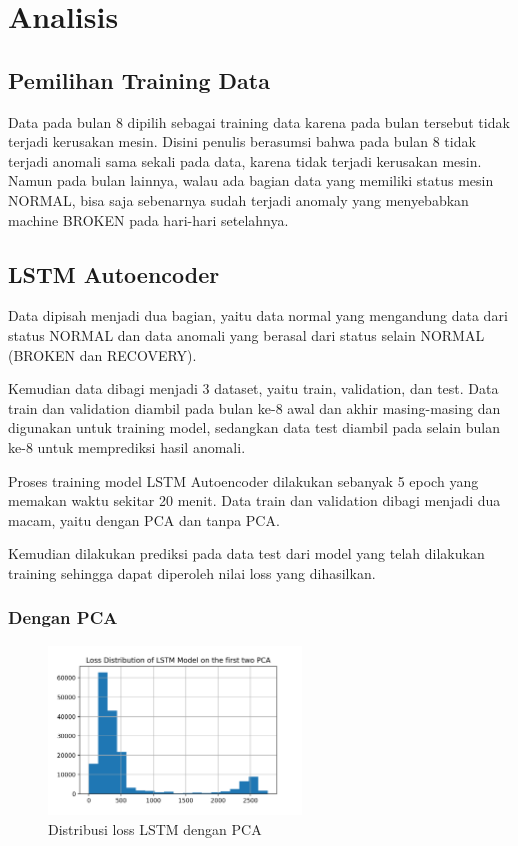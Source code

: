 \chapter{Analisis}

\section{Pemilihan Training Data}
Data pada bulan 8 dipilih sebagai training data karena pada bulan tersebut tidak terjadi kerusakan mesin. Disini penulis berasumsi bahwa pada bulan 8 tidak terjadi anomali sama sekali pada data, karena tidak terjadi kerusakan mesin. Namun pada bulan lainnya, walau ada bagian data yang memiliki status mesin NORMAL, bisa saja sebenarnya sudah terjadi anomaly yang menyebabkan machine BROKEN pada hari-hari setelahnya.

\section{LSTM Autoencoder}

Data dipisah menjadi dua bagian, yaitu data normal yang mengandung data dari status NORMAL dan data anomali yang berasal dari status selain NORMAL (BROKEN dan RECOVERY).

Kemudian data dibagi menjadi 3 dataset, yaitu train, validation, dan test. Data train dan validation diambil pada bulan ke-8 awal dan akhir masing-masing dan digunakan untuk training model, sedangkan data test diambil pada selain bulan ke-8 untuk memprediksi hasil anomali.

Proses training model LSTM Autoencoder dilakukan sebanyak 5 epoch yang memakan waktu sekitar 20 menit. Data train dan validation dibagi menjadi dua macam, yaitu dengan PCA dan tanpa PCA.

Kemudian dilakukan prediksi pada data test dari model yang telah dilakukan training sehingga dapat diperoleh nilai loss yang dihasilkan.

    \subsection{Dengan PCA}

    \begin{figure}[h]
        \centering
        \includegraphics[width=0.6\textwidth]{resources/LSTM/LSTM_PCA_LossDist.png}
        \caption{Distribusi loss LSTM dengan PCA}
    \end{figure}

